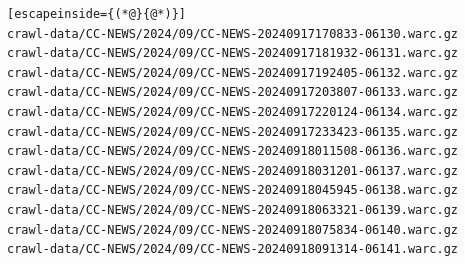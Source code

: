 \begin{lstlisting}[escapeinside={(*@}{@*)}]
crawl-data/CC-NEWS/2024/09/CC-NEWS-20240917170833-06130.warc.gz
crawl-data/CC-NEWS/2024/09/CC-NEWS-20240917181932-06131.warc.gz
crawl-data/CC-NEWS/2024/09/CC-NEWS-20240917192405-06132.warc.gz
crawl-data/CC-NEWS/2024/09/CC-NEWS-20240917203807-06133.warc.gz
crawl-data/CC-NEWS/2024/09/CC-NEWS-20240917220124-06134.warc.gz
crawl-data/CC-NEWS/2024/09/CC-NEWS-20240917233423-06135.warc.gz
crawl-data/CC-NEWS/2024/09/CC-NEWS-20240918011508-06136.warc.gz
crawl-data/CC-NEWS/2024/09/CC-NEWS-20240918031201-06137.warc.gz
crawl-data/CC-NEWS/2024/09/CC-NEWS-20240918045945-06138.warc.gz
crawl-data/CC-NEWS/2024/09/CC-NEWS-20240918063321-06139.warc.gz
crawl-data/CC-NEWS/2024/09/CC-NEWS-20240918075834-06140.warc.gz
crawl-data/CC-NEWS/2024/09/CC-NEWS-20240918091314-06141.warc.gz
\end{lstlisting}

